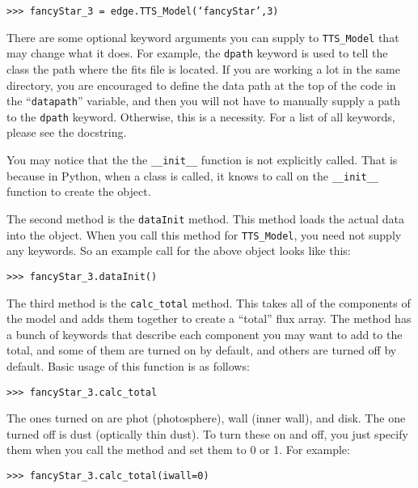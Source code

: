 \documentclass{article}
\begin{document}
\vspace{2mm}
\texttt{>>> fancyStar\_3 = edge.TTS\_Model(‘fancyStar’,3)}
\vspace{2mm}

\noindent There are some optional keyword arguments you can supply to \texttt{TTS\_Model} that may change what it does. For example, the \texttt{dpath} keyword is used to tell the class the path where the fits file is located. If you are working a lot in the same directory, you are encouraged to define the data path at the top of the code in the “\texttt{datapath}” variable, and then you will not have to manually supply a path to the \texttt{dpath} keyword. Otherwise, this is a necessity. For a list of all keywords, please see the docstring. 
 
You may notice that the the \texttt{\_\_init\_\_} function is not explicitly called. That is because in Python, when a class is called, it knows to call on the \texttt{\_\_init\_\_} function to create the object. 
 
The second method is the \texttt{dataInit} method. This method loads the actual data into the object. When you call this method for \texttt{TTS\_Model}, you need not supply any keywords. So an example call for the above object looks like this: 
 
\vspace{2mm}
\texttt{>>> fancyStar\_3.dataInit()}
\vspace{2mm}

The third method is the \texttt{calc\_total} method. This takes all of the components of the model and adds them together to create a “total” flux array. The method has a bunch of keywords that describe each component you may want to add to the total, and some of them are turned on by default, and others are turned off by default. Basic usage of this function is as follows:

\vspace{2mm}
\texttt{>>> fancyStar\_3.calc\_total}
\vspace{2mm}

\noindent The ones turned on are phot (photosphere), wall (inner wall), and disk. The one turned off is dust (optically thin dust). To turn these on and off, you just specify them when you call the method and set them to 0 or 1. For example: 

\vspace{2mm}
\texttt{>>> fancyStar\_3.calc\_total(iwall=0)}
\vspace{2mm}
 
\end{document}
